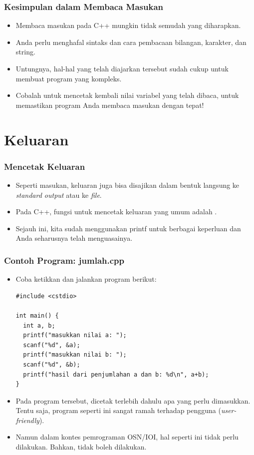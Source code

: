 \begin{frame}[fragile]
\frametitle{Kesimpulan dalam Membaca Masukan}
\begin{itemize}
  \item Membaca masukan pada C++ mungkin tidak semudah yang diharapkan.
  \item Anda perlu menghafal sintaks dan cara pembacaan bilangan, karakter, dan string.
  \item Untungnya, hal-hal yang telah diajarkan tersebut sudah cukup untuk membuat program yang kompleks.
  \item Cobalah untuk mencetak kembali nilai variabel yang telah dibaca, untuk memastikan program Anda membaca masukan dengan tepat!
\end{itemize}
\end{frame}

\section{Keluaran}
\frame{\sectionpage}

\begin{frame}
\frametitle{Mencetak Keluaran}
\begin{itemize}
  \item Seperti masukan, keluaran juga bisa disajikan dalam bentuk langsung ke \textit{standard output} atau ke \textit{file}.
  \item Pada C++, fungsi untuk mencetak keluaran yang umum adalah .
  \item Sejauh ini, kita sudah menggunakan printf untuk berbagai keperluan dan Anda seharusnya telah menguasainya.
\end{itemize}
\end{frame}

\begin{frame}[fragile]
\frametitle{Contoh Program: jumlah.cpp}
\begin{itemize}
  \item Coba ketikkan dan jalankan program berikut:
\begin{lstlisting}
#include <cstdio>

int main() {
  int a, b;
  printf("masukkan nilai a: ");
  scanf("%d", &a);
  printf("masukkan nilai b: ");
  scanf("%d", &b);
  printf("hasil dari penjumlahan a dan b: %d\n", a+b);
}
\end{lstlisting}
  \item Pada program tersebut, dicetak terlebih dahulu apa yang perlu dimasukkan. Tentu saja, program seperti ini sangat ramah terhadap pengguna (\textit{user-friendly}).
  \item Namun dalam kontes pemrograman OSN/IOI, hal seperti \newline ini tidak perlu dilakukan. Bahkan, tidak boleh dilakukan.
\end{itemize}
\end{frame}

